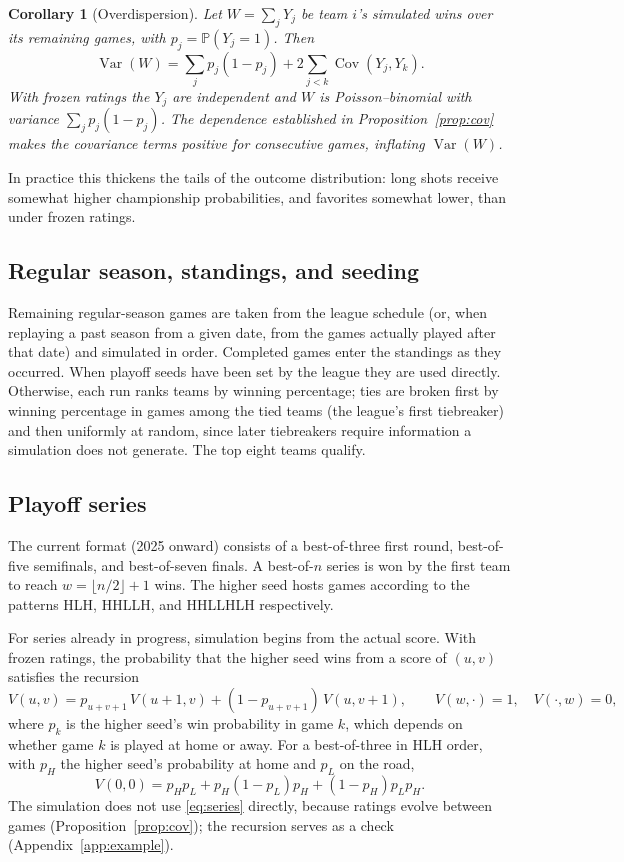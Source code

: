 \documentclass[11pt]{article}
\newcommand{\Prob}{\mathbb{P}}
\newcommand{\Var}{\operatorname{Var}}
\newcommand{\Cov}{\operatorname{Cov}}
\theoremstyle{plain}
\newtheorem{corollary}[proposition]{Corollary}
\theoremstyle{definition}
\theoremstyle{remark}
\begin{document}
\begin{corollary}[Overdispersion]
Let $W = \sum_j Y_j$ be team $i$'s simulated wins over its remaining games, with $p_j = \Prob(Y_j = 1)$. Then
\[
  \Var(W) = \sum_j p_j(1-p_j) + 2\sum_{j<k}\Cov(Y_j, Y_k).
\]
With frozen ratings the $Y_j$ are independent and $W$ is Poisson--binomial with variance $\sum_j p_j(1-p_j)$. The dependence established in Proposition~\ref{prop:cov} makes the covariance terms positive for consecutive games, inflating $\Var(W)$.
\end{corollary}

In practice this thickens the tails of the outcome distribution: long shots receive somewhat higher championship probabilities, and favorites somewhat lower, than under frozen ratings.

\subsection{Regular season, standings, and seeding}

Remaining regular-season games are taken from the league schedule (or, when replaying a past season from a given date, from the games actually played after that date) and simulated in order. Completed games enter the standings as they occurred. When playoff seeds have been set by the league they are used directly. Otherwise, each run ranks teams by winning percentage; ties are broken first by winning percentage in games among the tied teams (the league's first tiebreaker) and then uniformly at random, since later tiebreakers require information a simulation does not generate. The top eight teams qualify.

\subsection{Playoff series}

The current format (2025 onward) consists of a best-of-three first round, best-of-five semifinals, and best-of-seven finals. A best-of-$n$ series is won by the first team to reach $w = \lfloor n/2\rfloor + 1$ wins. The higher seed hosts games according to the patterns HLH, HHLLH, and HHLLHLH respectively.

For series already in progress, simulation begins from the actual score. With frozen ratings, the probability that the higher seed wins from a score of $(u, v)$ satisfies the recursion
\begin{equation}\label{eq:series}
  V(u, v) = p_{u+v+1}\,V(u+1, v) + (1 - p_{u+v+1})\,V(u, v+1),
  \qquad V(w, \cdot) = 1,\quad V(\cdot, w) = 0,
\end{equation}
where $p_k$ is the higher seed's win probability in game $k$, which depends on whether game $k$ is played at home or away. For a best-of-three in HLH order, with $p_H$ the higher seed's probability at home and $p_L$ on the road,
\begin{equation}\label{eq:bo3}
  V(0,0) = p_H p_L + p_H(1-p_L)p_H + (1-p_H)p_L p_H.
\end{equation}
The simulation does not use \eqref{eq:series} directly, because ratings evolve between games (Proposition~\ref{prop:cov}); the recursion serves as a check (Appendix~\ref{app:example}).
\end{document}
